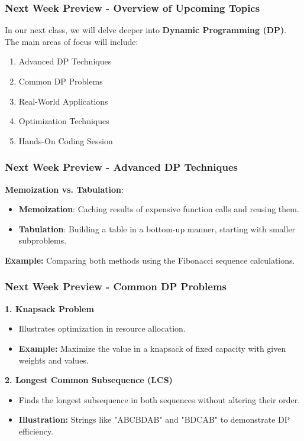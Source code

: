 \documentclass[aspectratio=169]{beamer}
\begin{document}
\begin{frame}[fragile]
  \frametitle{Next Week Preview - Overview of Upcoming Topics}
  In our next class, we will delve deeper into \textbf{Dynamic Programming (DP)}.
  The main areas of focus will include:
  \begin{enumerate}
    \item Advanced DP Techniques
    \item Common DP Problems
    \item Real-World Applications
    \item Optimization Techniques
    \item Hands-On Coding Session
  \end{enumerate}
\end{frame}

\begin{frame}[fragile]
  \frametitle{Next Week Preview - Advanced DP Techniques}
  \textbf{Memoization vs. Tabulation}:
  \begin{itemize}
    \item \textbf{Memoization}: Caching results of expensive function calls and reusing them.
    \item \textbf{Tabulation}: Building a table in a bottom-up manner, starting with smaller subproblems.
  \end{itemize}
  \textbf{Example:} Comparing both methods using the Fibonacci sequence calculations.
\end{frame}

\begin{frame}[fragile]
  \frametitle{Next Week Preview - Common DP Problems}
  \textbf{1. Knapsack Problem}
  \begin{itemize}
    \item Illustrates optimization in resource allocation.
    \item \textbf{Example:} Maximize the value in a knapsack of fixed capacity with given weights and values.
  \end{itemize}

  \textbf{2. Longest Common Subsequence (LCS)}
  \begin{itemize}
    \item Finds the longest subsequence in both sequences without altering their order.
    \item \textbf{Illustration:} Strings like "ABCBDAB" and "BDCAB" to demonstrate DP efficiency.
  \end{itemize}
\end{frame}
\end{document}

